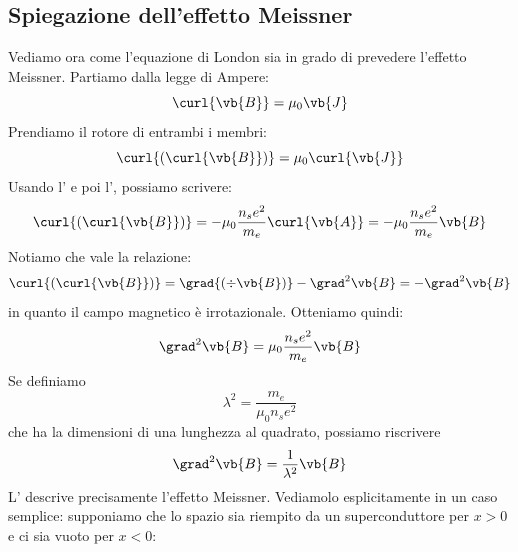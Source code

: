 \subsection{Spiegazione dell'effetto Meissner}
Vediamo ora come l'equazione di London sia in grado di prevedere l'effetto Meissner. Partiamo dalla legge di Ampere:
\begin{equation*}
   \curl{\vb{B}}
   =\mu_0 \vb{J}
\end{equation*}
Prendiamo il rotore di entrambi i membri:
\begin{equation*}
   \curl{(\curl{\vb{B}})}
   =\mu_0 \curl{\vb{J}}
\end{equation*}
Usando l' e poi l', possiamo scrivere:
\begin{equation*}
   \curl{(\curl{\vb{B}})}
   =-\mu_0 \frac{n_s e^2}{m_e} \curl{\vb{A}}
   =-\mu_0 \frac{n_s e^2}{m_e} \vb{B}
\end{equation*}
Notiamo che vale la relazione:
\begin{equation*}
   \curl{(\curl{\vb{B}})}
   =\grad{(\div{\vb{B}})} - \grad^2 \vb{B}
   =-\grad^2 \vb{B}
\end{equation*}
in quanto il campo magnetico è irrotazionale. Otteniamo quindi:
\begin{equation*}
   \grad^2 \vb{B}
   =\mu_0 \frac{n_s e^2}{m_e} \vb{B}
\end{equation*}
Se definiamo
\begin{equation}
   \lambda^2
   =\frac{m_e}{\mu_0 n_s e^2}
   \label{eq:lunghezza_di_penetrazione_London}
\end{equation}
che ha la dimensioni di una lunghezza al quadrato, possiamo riscrivere
\begin{equation}
   \grad^2 \vb{B}
   =\frac{1}{\lambda^2} \vb{B}
   \label{eq:equazione_di_London_per_effetto_Meissner}
\end{equation}
L' descrive precisamente l'effetto Meissner. Vediamolo esplicitamente in un caso semplice: supponiamo che lo spazio sia riempito da un superconduttore per $x>0$ e ci sia vuoto per $x<0$:
\begin{figure}[H]
   \centering
\end{figure}

